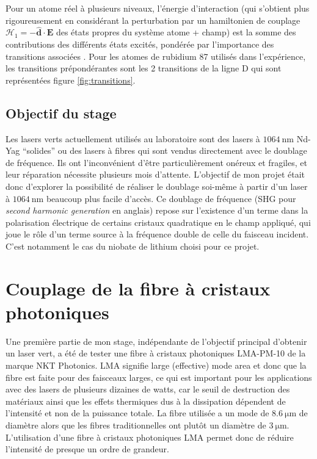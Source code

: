 \documentclass[11pt,a4paper] { article}
\newcommand{\lmbd}[1]{$\SI{#1}{\nano\metre}$}
\renewcommand{\v}[1]{\boldsymbol{\mathbf{#1}}}
\begin{document}
Pour un atome réel à plusieurs niveaux, l'énergie d'interaction (qui s'obtient plus rigoureusement en considérant la perturbation par un hamiltonien de couplage $\mathcal H_1 = - \hat{\v d} \cdot \v E$ des états propres du système atome + champ) est la somme des contributions des différents états excités, pondérée par l'importance des transitions associées \citep{grimm}. Pour les atomes de rubidium 87 utilisés dans l'expérience, les transitions prépondérantes sont les 2 transitions de la ligne D qui sont représentées figure \ref{fig:transitions}.


\subsection{Objectif du stage}

Les lasers verts actuellement utilisés au laboratoire sont des lasers à \lmbd{1064} Nd-Yag ``solides'' ou des lasers à fibres qui sont vendus directement avec le doublage de fréquence. Ils ont l'inconvénient d'être particulièrement onéreux et fragiles, et leur réparation nécessite plusieurs mois d'attente. L'objectif de mon projet était donc d'explorer la possibilité de réaliser le doublage soi-même à partir d'un laser à \lmbd{1064} beaucoup plus facile d'accès. Ce doublage de fréquence (SHG pour \textit{second harmonic generation} en anglais) repose sur l'existence d'un terme dans la polarisation électrique de certains cristaux quadratique en le champ appliqué, qui joue le rôle d'un terme source à la fréquence double de celle du faisceau incident. C'est notamment le cas du niobate de lithium choisi pour ce projet. %

\section{Couplage de la fibre à cristaux photoniques}
Une première partie de mon stage, indépendante de l'objectif principal d'obtenir un laser vert, a été de tester une fibre à cristaux photoniques
LMA-PM-10 de la marque NKT Photonics. LMA signifie large (effective) mode area et donc que la fibre est faite pour des faisceaux larges, ce qui est important pour les applications avec des lasers de plusieurs dizaines de watts, car le seuil de destruction des matériaux ainsi que les effets thermiques dus à la dissipation dépendent de l'intensité et non de la puissance totale. La fibre utilisée a un mode de $\SI{8.6}{\micro\meter}$ de diamètre alors que les fibres traditionnelles ont plutôt un diamètre de $\SI{3}{\micro\meter}$. L'utilisation d'une fibre à cristaux photoniques LMA permet donc de réduire l'intensité de presque un ordre de grandeur.
\end{document}

